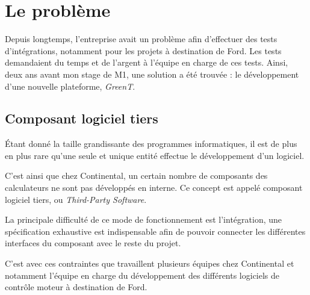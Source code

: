 \chapter{Le problème} \label{chapPb}
\putminitoc
Depuis longtemps, l'entreprise avait un problème afin d'effectuer des tests d'intégrations, notamment pour les projets à destination de Ford. Les tests demandaient du temps et de l'argent à l'équipe en charge de ces tests. Ainsi, deux ans avant mon stage de M1, une solution a été trouvée : le développement d'une nouvelle plateforme, \textit{GreenT}.
	\section{Composant logiciel tiers}
	Étant donné la taille grandissante des programmes informatiques, il est de plus en plus rare qu'une seule et unique entité effectue le développement d'un logiciel.
	
	C'est ainsi que chez Continental, un certain nombre de composants des calculateurs ne sont pas développés en interne. Ce concept est appelé composant logiciel tiers, ou \textit{Third-Party Software}. 
	
	La principale difficulté de ce mode de fonctionnement est l'intégration, une spécification exhaustive est indispensable afin de pouvoir connecter les différentes interfaces du composant avec le reste du projet. 
	
	C'est avec ces contraintes que travaillent plusieurs équipes chez Continental et notamment l'équipe en charge du développement des différents logiciels de contrôle moteur à destination de Ford.
	
